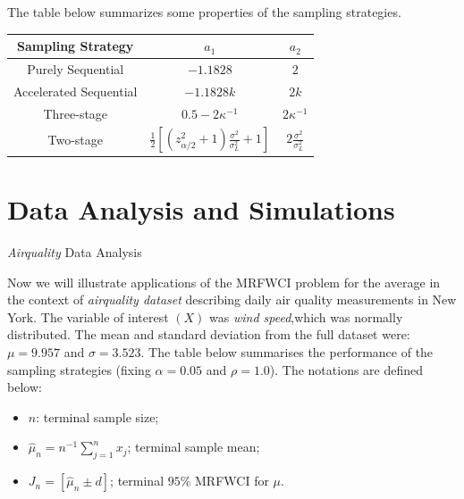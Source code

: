 \documentclass [xcolor=svgnames, t] {beamer}
\begin{document}
\begin{frame}{}
    \vspace{20mm}
    The table below summarizes some properties of the sampling strategies.
\begin{center}
\begin{tabular}{c c c} 
 \hline
 Sampling Strategy & $a_1$ & $a_2$ \\
 \hline
 Purely Sequential & $-1.1828$ & $2$  \\ 
Accelerated Sequential & $-1.1828k$ & $2k$  \\ 
Three-stage & $0.5-2\kappa^{-1}$ & $2\kappa^{-1}$  \\ 
 Two-stage & $\frac{1}{2}[(z^2_{\alpha/2}+1)\frac{\sigma^2}{\sigma^2_L}+1]$ & $2\frac{\sigma^2}{\sigma^2_L}$ \\
 \hline
\end{tabular}
\end{center}
\end{frame}
\section{Data Analysis and Simulations}
\begin{frame}{\textit{Airquality} Data Analysis}

Now we will illustrate applications of the MRFWCI problem for the average in the context of \textit{airquality dataset} 
describing daily air quality measurements in New York. The variable of interest $(X)$ was \textit{wind speed},which
was normally distributed. The mean and standard deviation from the full dataset were: $\mu = 9.957$ and $\sigma = 3.523$. 
The table below summarises the performance of the sampling strategies (fixing $\alpha=0.05$ and $\rho=1.0$). The notations are defined below:
\begin{itemize}
\item $n$: terminal sample size;
\item $\hat{\mu}_n=n^{-1}\sum_{j=1}^n{x_j}$; terminal sample mean;
\item $J_n=[\hat{\mu}_n \pm d]$; terminal $95\%$ MRFWCI for $\mu$.
\end{itemize}
    
\end{frame}
\end{document}
